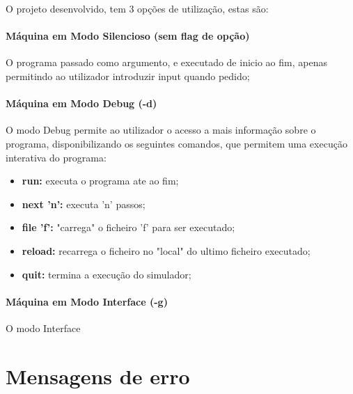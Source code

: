 \documentclass{report}
\begin{document}
O projeto desenvolvido, tem 3 opções de utilização, estas são:
\paragraph{\quad Máquina em Modo Silencioso (sem flag de opção)}
	O programa passado como argumento, e executado de inicio ao fim, apenas permitindo ao utilizador introduzir input quando pedido;
\paragraph{\quad Máquina em Modo Debug (-d)}
	O modo Debug permite ao utilizador o acesso a mais informação sobre o programa, disponibilizando
  os seguintes comandos, que permitem uma execução interativa do programa:
\begin{itemize}
	\item \textbf{run:} executa o programa ate ao fim;
	\item \textbf{next 'n':} executa 'n' passos;
	\item \textbf{file 'f':} "carrega" o ficheiro 'f' para ser executado;
	\item \textbf{reload:} recarrega o ficheiro no "local" do ultimo ficheiro executado;
	\item \textbf{quit:} termina a execução do simulador;
\end{itemize}
\paragraph{\quad Máquina em Modo Interface (-g)}
  O modo Interface
\section{Mensagens de erro}
\end{document}

